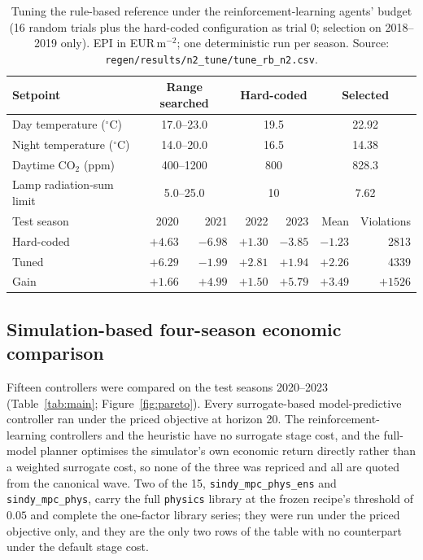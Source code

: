 \begin{table}[t]
\centering
\caption{Tuning the rule-based reference under the reinforcement-learning agents' budget
(16 random trials plus the hard-coded configuration as trial 0; selection on 2018--2019
only). EPI in EUR\,m$^{-2}$; one deterministic run per
season. Source: \texttt{regen/results/n2\_tune/tune\_rb\_n2.csv}.}
\label{tab:tune}
\small
\begin{tabular}{@{}lrrrrrr@{}}
\toprule
Setpoint & \multicolumn{2}{c}{Range searched} & \multicolumn{2}{c}{Hard-coded} & \multicolumn{2}{c}{Selected} \\
\midrule
Day temperature ($^\circ$C) & \multicolumn{2}{c}{17.0--23.0} & \multicolumn{2}{c}{19.5} & \multicolumn{2}{c}{22.92} \\
Night temperature ($^\circ$C) & \multicolumn{2}{c}{14.0--20.0} & \multicolumn{2}{c}{16.5} & \multicolumn{2}{c}{14.38} \\
Daytime CO$_2$ (ppm) & \multicolumn{2}{c}{400--1200} & \multicolumn{2}{c}{800} & \multicolumn{2}{c}{828.3} \\
Lamp radiation-sum limit & \multicolumn{2}{c}{5.0--25.0} & \multicolumn{2}{c}{10} & \multicolumn{2}{c}{7.62} \\
\midrule
Test season & 2020 & 2021 & 2022 & 2023 & Mean & Violations \\
\midrule
Hard-coded & $+4.63$ & $-6.98$ & $+1.30$ & $-3.85$ & $-1.23$ & 2813 \\
Tuned & $+6.29$ & $-1.99$ & $+2.81$ & $+1.94$ & $\mathbf{+2.26}$ & 4339 \\
Gain & $+1.66$ & $+4.99$ & $+1.50$ & $+5.79$ & $\mathbf{+3.49}$ & $+1526$ \\
\bottomrule
\end{tabular}
\end{table}

\subsection{Simulation-based four-season economic comparison}
\label{sec:res-main}

Fifteen controllers were compared on the test seasons 2020--2023 (Table~\ref{tab:main};
Figure~\ref{fig:pareto}). Every surrogate-based model-predictive controller ran
under the priced objective at horizon 20. The reinforcement-learning controllers and the
heuristic have no surrogate stage cost, and the full-model planner optimises the
simulator's own economic return directly rather than a weighted surrogate cost, so none of
the three was repriced and all are quoted from the canonical wave. Two of the 15, \texttt{sindy\_mpc\_phys\_ens} and \texttt{sindy\_mpc\_phys}, carry the full
\texttt{physics} library at the frozen recipe's threshold of $0.05$ and complete the
one-factor library series; they were run under the priced objective only, and they are the
only two rows of the table with no counterpart under the default stage cost.

